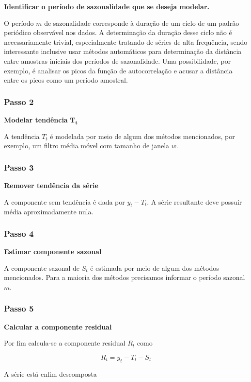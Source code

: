 \textbf{Identificar o período de sazonalidade que se deseja modelar.}

O período $m$ de sazonalidade corresponde à duração de um ciclo de um padrão
periódico observável nos dados. A determinação da duração desse ciclo não é
necessariamente trivial, especialmente tratando de séries de alta frequência,
sendo interessante inclusive usar métodos automáticos para determinação da
distância entre amostras iniciais dos períodos de sazonalidade. Uma
possibilidade, por exemplo,  é analisar os picos da função de autocorrelação e
acusar a distância entre os picos como um período amostral.

\subsubsection{Passo 2}

\textbf{Modelar tendência }$\mathbf{T_t}$

A tendência $T_t$ é modelada por meio de algum dos métodos mencionados, por
exemplo, um filtro média móvel com tamanho de janela $w$.

\subsubsection{Passo 3}

\textbf{Remover tendência da série}

A componente sem tendência é dada por $y_t - T_t$. A série resultante deve
possuir média aproximadamente nula.

\subsubsection{Passo 4}

\textbf{Estimar componente sazonal}

A componente sazonal de $S_t$ é estimada por meio de algum dos métodos
mencionados. Para a maioria dos métodos precisamos informar o período sazonal
$m$.

\subsubsection{Passo 5}

\textbf{Calcular a componente residual}

Por fim calcula-se a componente residual $R_t$ como

$$ R_t = y_t - T_t - S_t $$

A série está enfim descomposta

